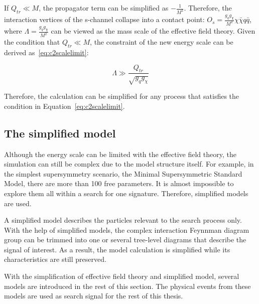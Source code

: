 If $Q_{tr} \ll M$, the propagator term can be simplified as $-\frac{1}{M^2}$. Therefore, the interaction vertices of the s-channel collapse into a contact point: $O_{s}=\frac{g_{q}g_{\chi}}{M^{2}}\chi\bar{\chi}q\bar{q}$, where $\Lambda=\frac{g_{q}g_{\chi}}{M^{2}}$ can be viewed as the mass scale of the effective field theory. Given the condition that $Q_{tr} \ll M$, the constraint of the new energy scale can be derived as~\ref{eq:c2scalelimit}:

\begin{equation}
  \Lambda \gg \frac{Q_{tr}}{\sqrt{g_{q}g_{\chi}}}
  \label{eq:c2scalelimit}
\end{equation}

Therefore, the calculation can be simplified for any process that satisfies the condition in Equation~\ref{eq:c2scalelimit}.

\subsection{The simplified model}
\par Although the energy scale can be limited with the effective field theory, the simulation can still be complex due to the model structure itself. For example, in the simplest supersymmetry scenario, the Minimal Supersymmetric Standard Model, there are more than 100 free parameters. It is almost impossible to explore them all within a search for one signature. Therefore, simplified models\cite{SimplifiedModels-Alves2012} are used.

\par A simplified model describes the particles relevant to the search process only. With the help of simplified models, the complex interaction Feynnman diagram group can be trimmed into one or several tree-level diagrams that describe the signal of interest. As a result, the model calculation is simplified while its characteristics are still preserved. 

\par With the simplification of effective field theory and simplified model, several models are introduced in the rest of this section. The physical events from these models are used as search signal for the rest of this thesis.

